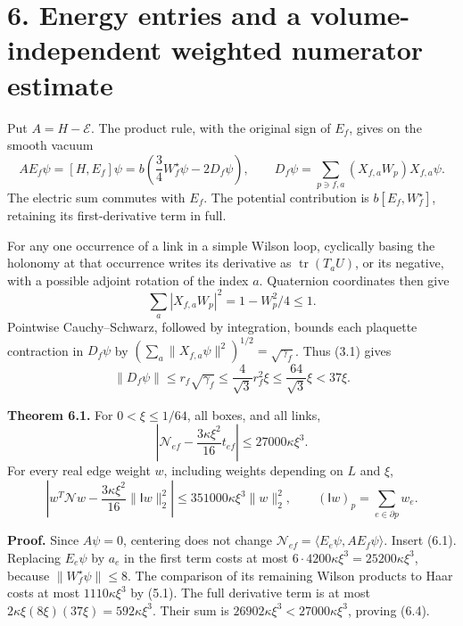 \documentclass[
]{article}
\begin{document}
\section{6. Energy entries and a volume-independent weighted numerator
estimate}\label{energy-entries-and-a-volume-independent-weighted-numerator-estimate}

Put \(A=H-\mathcal E\). The product rule, with the original sign of
\(E_f\), gives on the smooth vacuum \[
AE_f\psi=[H,E_f]\psi
=b\left(\frac34W_f^{\star}\psi-2D_f\psi\right),\qquad
D_f\psi=\sum_{p\ni f,a}(X_{f,a}W_p)X_{f,a}\psi.                \tag{6.1}
\] The electric sum commutes with \(E_f\). The potential contribution is
\(b[E_f,W_f^{\star}]\), retaining its first-derivative term in full.

For any one occurrence of a link in a simple Wilson loop, cyclically
basing the holonomy at that occurrence writes its derivative as
\(\operatorname{tr}(T_aU)\), or its negative, with a possible adjoint
rotation of the index \(a\). Quaternion coordinates then give \[
\sum_a|X_{f,a}W_p|^2=1-W_p^2/4\le1.                           \tag{6.2}
\] Pointwise Cauchy--Schwarz, followed by integration, bounds each
plaquette contraction in \(D_f\psi\) by
\((\sum_a\|X_{f,a}\psi\|^2)^{1/2}=\sqrt{\gamma_f}\). Thus (3.1) gives \[
\|D_f\psi\|\le r_f\sqrt{\gamma_f}
 \le\frac4{\sqrt3}r_f^2\xi\le\frac{64}{\sqrt3}\xi<37\xi.     \tag{6.3}
\]

\textbf{Theorem 6.1.} For \(0<\xi\le1/64\), all boxes, and all links, \[
\left|\mathcal N_{ef}-\frac{3\kappa\xi^2}{16}t_{ef}\right|
 \le27000\kappa\xi^3.                                        \tag{6.4}
\] For every real edge weight \(w\), including weights depending on
\(L\) and \(\xi\), \[
\left|w^T\mathcal Nw-\frac{3\kappa\xi^2}{16}\|\mathsf Iw\|_2^2\right|
 \le351000\kappa\xi^3\|w\|_2^2,\qquad
 (\mathsf Iw)_p=\sum_{e\in\partial p}w_e.                     \tag{6.5}
\]

\textbf{Proof.} Since \(A\psi=0\), centering does not change
\(\mathcal N_{ef}=\langle E_e\psi,AE_f\psi\rangle\). Insert (6.1).
Replacing \(E_e\psi\) by \(a_e\) in the first term costs at most
\(6\cdot4200\kappa\xi^3=25200\kappa\xi^3\), because
\(\|W_f^{\star}\psi\|\le8\). The comparison of its remaining Wilson
products to Haar costs at most \(1110\kappa\xi^3\) by (5.1). The full
derivative term is at most \(2\kappa\xi(8\xi)(37\xi)=592\kappa\xi^3\).
Their sum is \(26902\kappa\xi^3<27000\kappa\xi^3\), proving (6.4).
\end{document}
